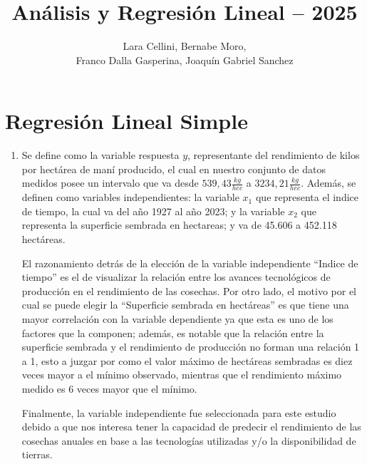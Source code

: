 \documentclass[spanish,12pt,a4paper]{article}
\title{Análisis y Regresión Lineal – 2025}
\author{Lara Cellini, Bernabe Moro,\\Franco Dalla Gasperina, Joaquín Gabriel Sanchez}
\begin{document}
	
	\maketitle
	
	\section{Regresión Lineal Simple}
	
	\begin{enumerate}[label=\alph*)]
		\item Se define como la variable respuesta $y$, representante del rendimiento de kilos por hectárea de maní producido, el cual en nuestro conjunto de datos medidos posee un intervalo que va desde $539,43 \frac{kg}{hec}$ a $3234,21 \frac{kg}{hec}$. Además, se definen como variables independientes: la variable $x_1$ que representa el indice de tiempo, la cual va del año 1927 al año 2023; y la variable $x_2$ que representa la superficie sembrada en hectareas; y va de 45.606 a 452.118 hectáreas.
		
		El razonamiento detrás de la elección de la variable independiente ``Indice de tiempo'' es el de visualizar la relación entre los avances tecnológicos de producción en el rendimiento de las cosechas. Por otro lado, el motivo por el cual se puede elegir la ``Superficie sembrada en hectáreas'' es que tiene una mayor correlación con la variable dependiente ya que esta es uno de los factores que la componen; además, es notable que la relación entre la superficie sembrada y el rendimiento de producción no forman una relación 1 a 1, esto a juzgar por como el valor máximo de hectáreas sembradas es diez veces mayor a el mínimo observado, mientras que el rendimiento máximo medido es 6 veces mayor que el mínimo.
		
		Finalmente, la variable independiente fue seleccionada para este estudio debido a que nos interesa tener la capacidad de predecir el rendimiento de las cosechas anuales en base a las tecnologías utilizadas y/o la disponibilidad de tierras.
		

\end{enumerate}
\end{document}
